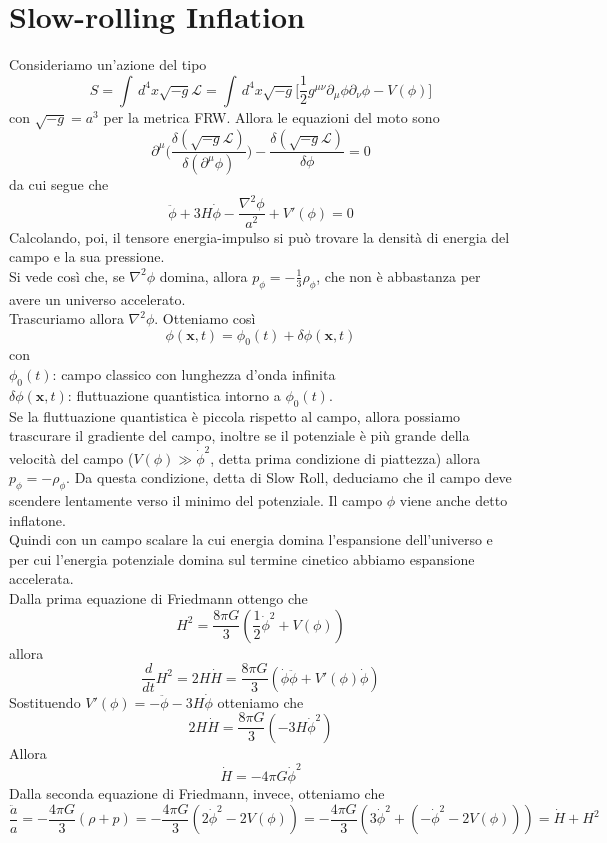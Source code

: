 \documentclass[10pt,a4paper]{article}
\let\oldmarginpar\marginpar
\renewcommand\marginpar[1]{\-\oldmarginpar[\raggedleft\footnotesize #1]%
	{\raggedright\footnotesize #1}}
\theoremstyle{break}
\theoremstyle{remark}
\theoremstyle{definition}
\newcommand{\Lagr}{\mathcal{L}}
\begin{document}
\section{Slow-rolling Inflation}
Consideriamo un'azione del tipo
\[
S = \int\,d^4x\sqrt{-g}\Lagr = \int\,d^4x\sqrt{-g}\bigg[\frac12 g^{\mu \nu}\partial_\mu\phi \partial_\nu\phi - V(\phi)\bigg]
\]
con $\sqrt{-g} = a^3$ per la metrica FRW. Allora le equazioni del moto sono
\[
\partial^\mu\bigg(\frac{\delta(\sqrt{-g}\Lagr)}{\delta(\partial^\mu \phi)}\bigg) - \frac{\delta(\sqrt{-g}\Lagr)}{\delta\phi} = 0
\]
da cui segue che
\[
\ddot{\phi} + 3H\dot{\phi} - \frac{\nabla^2 \phi}{a^2} + V'(\phi) = 0
\]
\marginpar{Fare il calcolo}
Calcolando, poi, il tensore energia-impulso si può trovare la densità di energia del campo e la sua pressione.
\\
Si vede così che, se $\nabla^2 \phi$ domina, allora $p_\phi = -\frac13 \rho_\phi$, che non è abbastanza per avere un universo accelerato.\\
Trascuriamo allora $\nabla^2 \phi$. Otteniamo così
\[
\phi(\boldsymbol{x},t) = \phi_0(t) + \delta\phi(\boldsymbol{x}, t)
\]
con\\
$\phi_0(t)$: campo classico con lunghezza d'onda infinita\\
$\delta\phi(\boldsymbol{x}, t)$: fluttuazione quantistica intorno a $\phi_0(t)$.
\\
Se la fluttuazione quantistica è piccola rispetto al campo, allora possiamo trascurare il gradiente del campo, inoltre se il potenziale è più grande della velocità del campo ($V(\phi) \gg \dot{\phi}^2$, detta prima condizione di piattezza) allora  $p_\phi = - \rho_\phi$. Da questa condizione, detta di Slow Roll, deduciamo che il campo deve scendere lentamente verso il minimo del potenziale. Il campo $\phi$ viene anche detto inflatone.
\\
Quindi con un campo scalare la cui energia domina l'espansione dell'universo e per cui l'energia potenziale domina sul termine cinetico abbiamo espansione accelerata.
\\
Dalla prima equazione di Friedmann ottengo che
\[
H^2 = \frac{8 \pi G}{3}(\frac12 \dot{\phi}^2 + V(\phi))
\]
allora
\[
\frac{d}{dt}H^2 = 2H\dot{H} = \frac{8 \pi G}{3}(\dot{\phi}\ddot{\phi} + V'(\phi)\dot{\phi})
\]
Sostituendo $V'(\phi) = -\ddot{\phi} - 3H\dot{\phi}$ otteniamo che
\[
 2H\dot{H} = \frac{8 \pi G}{3}(-3 H \dot{\phi}^2)
\]
Allora
\[
\boxed{
\dot{H} = -4\pi G\dot{\phi}^2
}
\]
Dalla seconda equazione di Friedmann, invece, otteniamo che
\[
\frac{\ddot{a}}{a} = -\frac{4 \pi G}{3} (\rho + p) = -\frac{4 \pi G}{3}(2\dot{\phi}^2 - 2V(\phi)) = -\frac{4 \pi G}{3}(3\dot{\phi}^2 + (-\dot{\phi}^2 - 2V(\phi))) = \dot{H} + H^2
\]
\end{document}
